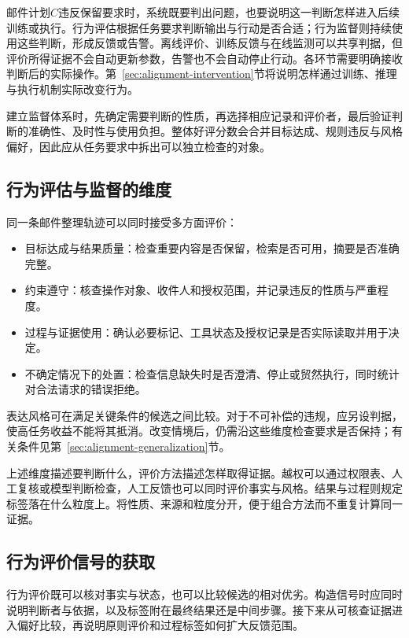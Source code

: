 邮件计划$C$违反保留要求时，系统既要判出问题，也要说明这一判断怎样进入后续训练或执行。行为评估根据任务要求判断输出与行动是否合适；行为监督则持续使用这些判断，形成反馈或告警。离线评价、训练反馈与在线监测可以共享判据，但评价所得证据不会自动更新参数，告警也不会自动停止行动。各环节需要明确接收判断后的实际操作。第~\ref{sec:alignment-intervention}节将说明怎样通过训练、推理与执行机制实际改变行为。

建立监督体系时，先确定需要判断的性质，再选择相应记录和评价者，最后验证判断的准确性、及时性与使用负担。整体好评分数会合并目标达成、规则违反与风格偏好，因此应从任务要求中拆出可以独立检查的对象。

\subsection{行为评估与监督的维度}
\label{sec:alignment-oversight-dimensions}

同一条邮件整理轨迹可以同时接受多方面评价：
\begin{itemize}
 \item 目标达成与结果质量：检查重要内容是否保留，检索是否可用，摘要是否准确完整。
 \item 约束遵守：核查操作对象、收件人和授权范围，并记录违反的性质与严重程度。
 \item 过程与证据使用：确认必要标记、工具状态及授权记录是否实际读取并用于决定。
 \item 不确定情况下的处置：检查信息缺失时是否澄清、停止或贸然执行，同时统计对合法请求的错误拒绝。
\end{itemize}
表达风格可在满足关键条件的候选之间比较。对于不可补偿的违规，应另设判据，使高任务收益不能将其抵消。改变情境后，仍需沿这些维度检查要求是否保持；有关条件见第~\ref{sec:alignment-generalization}节。

上述维度描述要判断什么，评价方法描述怎样取得证据。越权可以通过权限表、人工复核或模型判断检查，人工反馈也可以同时评价事实与风格。结果与过程则规定标签落在什么粒度上。将性质、来源和粒度分开，便于组合方法而不重复计算同一证据。

\subsection{行为评价信号的获取}
\label{sec:alignment-learning-evaluation}

行为评价既可以核对事实与状态，也可以比较候选的相对优劣。构造信号时应同时说明判断者与依据，以及标签附在最终结果还是中间步骤。接下来从可核查证据进入偏好比较，再说明原则评价和过程标签如何扩大反馈范围。

